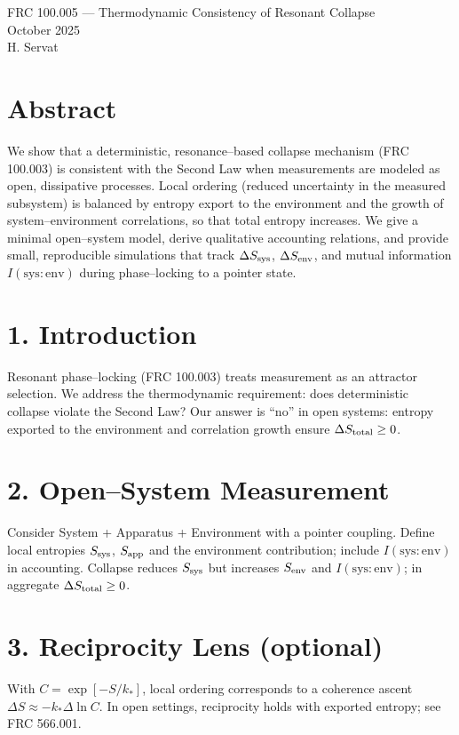 \documentclass[10pt]{article}
\begin{document}
\begin{center}
{\Large FRC 100.005 — Thermodynamic Consistency of Resonant Collapse}\\
{\large October 2025}\\[4pt]
H. Servat
\end{center}

\section*{Abstract}
We show that a deterministic, resonance--based collapse mechanism (FRC 100.003) is consistent with the Second Law when measurements are modeled as open, dissipative processes. Local ordering (reduced uncertainty in the measured subsystem) is balanced by entropy export to the environment and the growth of system--environment correlations, so that total entropy increases. We give a minimal open--system model, derive qualitative accounting relations, and provide small, reproducible simulations that track $\Delta S_{\rm sys}$, $\Delta S_{\rm env}$, and mutual information $I(\mathrm{sys:env})$ during phase--locking to a pointer state.

\section*{1. Introduction}
Resonant phase--locking (FRC 100.003) treats measurement as an attractor selection. We address the thermodynamic requirement: does deterministic collapse violate the Second Law? Our answer is ``no'' in open systems: entropy exported to the environment and correlation growth ensure $\Delta S_{\rm total}\ge 0$.

\section*{2. Open--System Measurement}
Consider System + Apparatus + Environment with a pointer coupling. Define local entropies $S_{\rm sys}$, $S_{\rm app}$ and the environment contribution; include $I(\mathrm{sys:env})$ in accounting. Collapse reduces $S_{\rm sys}$ but increases $S_{\rm env}$ and $I(\mathrm{sys:env})$; in aggregate $\Delta S_{\rm total}\ge 0$.

\section*{3. Reciprocity Lens (optional)}
With $C=\exp[-S/k_*]$, local ordering corresponds to a coherence ascent $\Delta S\approx -k_*\Delta\ln C$. In open settings, reciprocity holds with exported entropy; see FRC 566.001.
\end{document}
